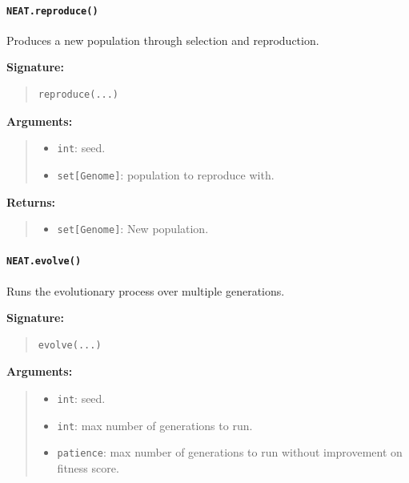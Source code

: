 \documentclass[11pt]{article}
\begin{document}
\paragraph{\texttt{NEAT.reproduce()}}

Produces a new population through selection and reproduction.

\textbf{Signature:}
\begin{quote}
\begin{verbatim}
reproduce(...)
\end{verbatim}
\end{quote}

\textbf{Arguments:}
\begin{quote}
\begin{itemize}
    \item \texttt{int}: seed.
    \item \texttt{set[Genome]}: population to reproduce with.
\end{itemize}
\end{quote}

\textbf{Returns:}
\begin{quote}
\begin{itemize}
    \item \texttt{set[Genome]}: New population.
\end{itemize}
\end{quote}

\paragraph{\texttt{NEAT.evolve()}}

Runs the evolutionary process over multiple generations.

\textbf{Signature:}
\begin{quote}
\begin{verbatim}
evolve(...)
\end{verbatim}
\end{quote}

\textbf{Arguments:}
\begin{quote}
\begin{itemize}
    \item \texttt{int}: seed.
    \item \texttt{int}: max number of generations to run.
    \item \texttt{patience}: max number of generations to run without improvement on fitness score.
\end{itemize}
\end{quote}
\end{document}
